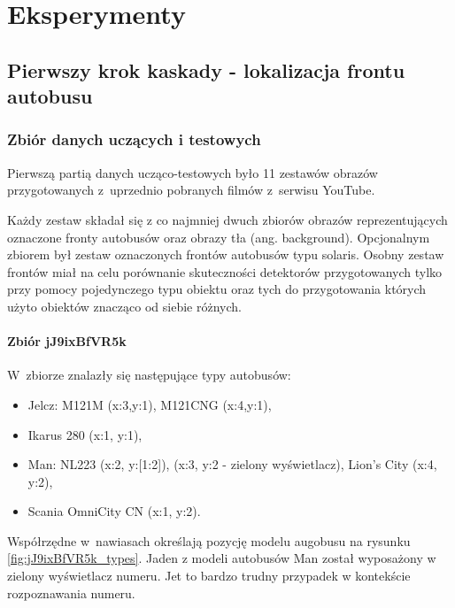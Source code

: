 \chapter{Eksperymenty}

\section{Pierwszy krok kaskady - lokalizacja frontu autobusu}

\subsection{Zbiór danych uczących i testowych}

Pierwszą partią danych ucząco-testowych było 11 zestawów obrazów
przygotowanych z~uprzednio pobranych filmów z~serwisu YouTube.

Każdy zestaw składał się z co najmniej dwuch zbiorów obrazów 
reprezentujących oznaczone fronty autobusów oraz obrazy tła
(ang. background). Opcjonalnym zbiorem był zestaw oznaczonych 
frontów autobusów typu solaris. Osobny zestaw frontów miał na celu
porównanie skuteczności detektorów przygotowanych tylko przy pomocy
pojedynczego typu obiektu oraz tych do przygotowania których użyto
obiektów znacząco od siebie różnych.

\newpage
\subsubsection{Zbiór jJ9ixBfVR5k}

W~zbiorze znalazły się następujące typy autobusów: 
\begin{itemize}
    \item Jelcz: M121M (x:3,y:1), M121CNG (x:4,y:1),
    \item Ikarus 280 (x:1, y:1),
    \item Man: NL223 (x:2, y:[1:2]), (x:3, y:2 - zielony wyświetlacz),
        Lion's City (x:4, y:2),
    \item Scania OmniCity CN (x:1, y:2). 
\end{itemize}
Współrzędne w~nawiasach określają pozycję modelu augobusu na rysunku
\ref{fig:jJ9ixBfVR5k_types}.
Jaden z modeli autobusów Man został wyposażony w zielony wyświetlacz numeru.
Jet to bardzo trudny przypadek w kontekście rozpoznawania numeru.

